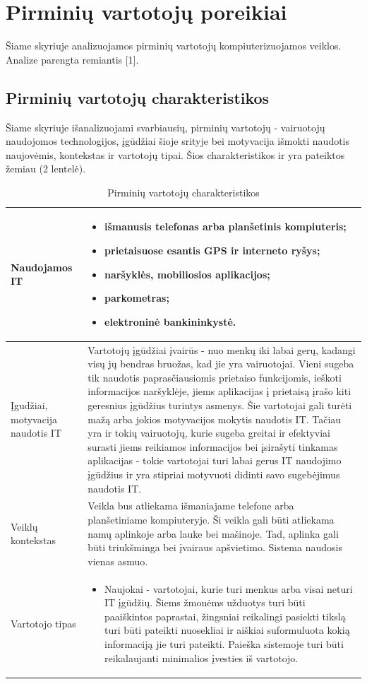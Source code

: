 \documentclass{VUMIFPSkursinis}
\begin{document}
\section{Pirminių vartotojų poreikiai}
Šiame skyriuje analizuojamos pirminių vartotojų kompiuterizuojamos veiklos. Analize parengta remiantis [1].
\subsection{Pirminių vartotojų charakteristikos}

Šiame skyriuje išanalizuojami svarbiausių, pirminių vartotojų - vairuotojų naudojomos technologijos, įgūdžiai šioje srityje bei motyvacija išmokti naudotis naujovėmis, kontekstas ir vartotojų tipai. Šios charakteristikos ir yra pateiktos žemiau (2 lentelė).
\begin{table}[H]\footnotesize
  \centering
  \caption{Pirminių vartotojų charakteristikos}
  {\begin{tabular}{|p{}|p{}|} 
	\hline
	Naudojamos IT  & \begin{itemize}
						  \item išmanusis telefonas arba planšetinis kompiuteris;
						  \item	prietaisuose esantis GPS ir interneto ryšys;
						  \item	naršyklės, mobiliosios aplikacijos;
						  \item	parkometras;
						  \item	elektroninė bankininkystė.
					  \end{itemize}
					  \\
	\hline
    Įgudžiai, motyvacija naudotis IT  & Vartotojų įgūdžiai įvairūs - nuo menkų iki labai gerų, kadangi visų jų bendras bruožas, kad jie yra vairuotojai. Vieni sugeba tik naudotis paprasčiausiomis prietaiso funkcijomis, ieškoti informacijos naršyklėje, jiems aplikacijas į prietaisą įrašo kiti geresnius įgūdžius turintys asmenys. Šie vartotojai gali turėti mažą arba jokios motyvacijos mokytis naudotis IT. Tačiau yra ir tokių vairuotojų, kurie sugeba greitai ir efektyviai surasti jiems reikiamos informacijos bei įsirašyti tinkamas aplikacijas - tokie vartotojai turi labai gerus IT naudojimo įgūdžius ir yra stipriai motyvuoti didinti savo sugebėjimus naudotis IT.   \\
	\hline
    Veiklų kontekstas	& Veikla bus atliekama išmaniajame telefone arba planšetiniame kompiuteryje. Ši veikla gali būti atliekama namų aplinkoje arba lauke bei mašinoje. Tad, aplinka gali būti triukšminga bei įvairaus apšvietimo. Sistema naudosis vienas asmuo.     	    		  \\
	\hline
    Vartotojo tipas 	 & \begin{itemize}
							  \item Naujokai - vartotojai, kurie turi menkus arba visai neturi IT įgūdžių. Šiems žmonėms užduotys turi būti paaiškintos paprastai, žingsniai reikalingi pasiekti tikslą turi būti pateikti nuosekliai ir aiškiai suformuluota kokią informaciją jie turi pateikti. Paieška sistemoje turi būti reikalaujanti minimalios įvesties iš vartotojo.


\end{itemize}
\end{tabular}}
\end{table}
\end{document}
